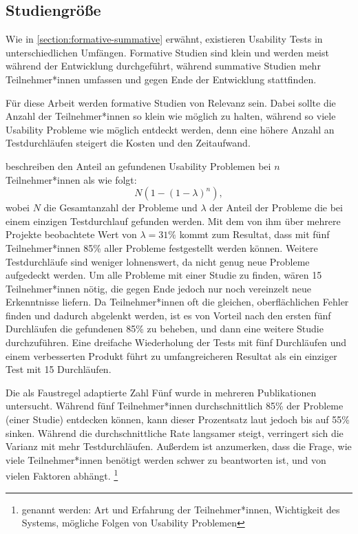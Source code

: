 \subsection{Studiengröße}
Wie in \ref{section:formative-summative} erwähnt, existieren Usability Tests in unterschiedlichen Umfängen. Formative Studien sind klein und werden meist während der Entwicklung durchgeführt, während summative Studien mehr Teilnehmer*innen umfassen und gegen Ende der Entwicklung stattfinden.

Für diese Arbeit werden formative Studien von Relevanz sein. Dabei sollte die Anzahl der Teilnehmer*innen so klein wie möglich zu halten, während so viele Usability Probleme wie möglich entdeckt werden, denn eine höhere Anzahl an Testdurchläufen steigert die Kosten und den Zeitaufwand.
\parencites{faulknerFiveuserAssumption2003, nielsenWhyYou2000}

\textcite{nielsenMathematicalModel1993} beschreiben den Anteil an gefundenen Usability Problemen bei $n$ Teilnehmer*innen als wie folgt:
\begin{equation}
\label{equation:finding-usability-problems}
  N(1-(1-\lambda{})^n),
\end{equation}
wobei $N$ die Gesamtanzahl der Probleme und $\lambda{}$ der Anteil der Probleme die bei einem einzigen Testdurchlauf gefunden werden. Mit dem von ihm über mehrere Projekte beobachtete Wert von $\lambda{}=31\%$ kommt \textcite{nielsenWhyYou2000} zum Resultat, dass mit fünf Teilnehmer*innen 85\% aller Probleme festgestellt werden können. \cite{nielsenWhyYou2000} Weitere Testdurchläufe sind weniger lohnenswert, da nicht genug neue Probleme aufgedeckt werden. Um alle Probleme mit einer Studie zu finden, wären 15 Teilnehmer*innen nötig, die gegen Ende jedoch nur noch vereinzelt neue Erkenntnisse liefern. Da Teilnehmer*innen oft die gleichen, oberflächlichen Fehler finden und dadurch abgelenkt werden, ist es von Vorteil nach den ersten fünf Durchläufen die gefundenen 85\% zu beheben, und dann eine weitere Studie durchzuführen. Eine dreifache Wiederholung der Tests mit fünf Durchläufen und einem verbesserten Produkt führt zu umfangreicheren Resultat als ein einziger Test mit 15 Durchläufen.
\parencite{nielsenWhyYou2000}

Die als Faustregel adaptierte Zahl Fünf wurde in mehreren Publikationen untersucht. Während fünf Teilnehmer*innen durchschnittlich 85\% der Probleme (einer Studie) entdecken können, kann dieser Prozentsatz laut \textcite{faulknerFiveuserAssumption2003} jedoch bis auf 55\% sinken. Während die durchschnittliche Rate langsamer steigt, verringert sich die Varianz mit mehr Testdurchläufen. Außerdem ist anzumerken, dass die Frage, wie viele Teilnehmer*innen benötigt werden schwer zu  beantworten ist, und von vielen Faktoren abhängt. \footnote{genannt werden: Art und Erfahrung der Teilnehmer*innen, Wichtigkeit des Systems, mögliche Folgen von Usability Problemen}
\parencite{faulknerFiveuserAssumption2003}

